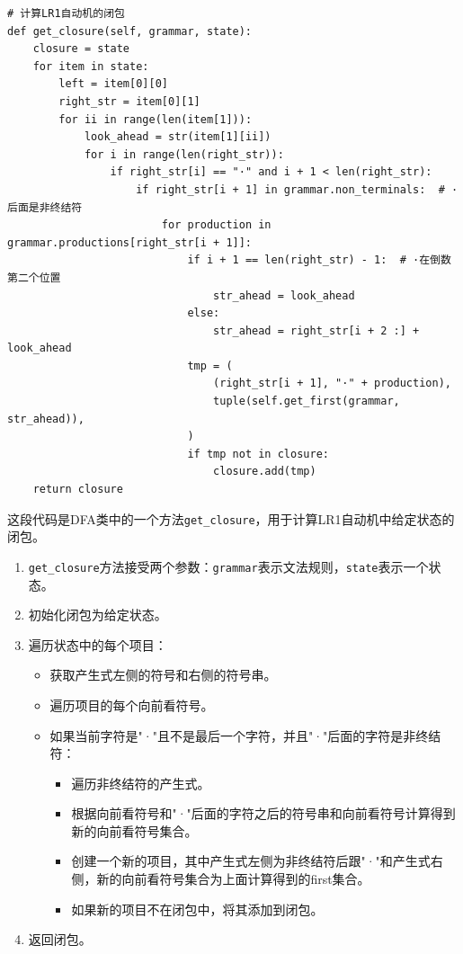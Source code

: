 \documentclass[lang=cn,11pt,a4paper]{elegantpaper}
\begin{document}
\begin{lstlisting}
# 计算LR1自动机的闭包
def get_closure(self, grammar, state):
    closure = state
    for item in state:
        left = item[0][0]
        right_str = item[0][1]
        for ii in range(len(item[1])):
            look_ahead = str(item[1][ii])
            for i in range(len(right_str)):
                if right_str[i] == "·" and i + 1 < len(right_str):
                    if right_str[i + 1] in grammar.non_terminals:  # ·后面是非终结符
                        for production in grammar.productions[right_str[i + 1]]:
                            if i + 1 == len(right_str) - 1:  # ·在倒数第二个位置
                                str_ahead = look_ahead
                            else:
                                str_ahead = right_str[i + 2 :] + look_ahead
                            tmp = (
                                (right_str[i + 1], "·" + production),
                                tuple(self.get_first(grammar, str_ahead)),
                            )
                            if tmp not in closure:
                                closure.add(tmp)
    return closure
\end{lstlisting}

这段代码是DFA类中的一个方法\lstinline{get_closure}，用于计算LR1自动机中给定状态的闭包。

\begin{enumerate}
    \item \lstinline{get_closure}方法接受两个参数：\lstinline{grammar}表示文法规则，\lstinline{state}表示一个状态。
    \item 初始化闭包为给定状态。
    \item 遍历状态中的每个项目：
    \begin{itemize}
        \item 获取产生式左侧的符号和右侧的符号串。
        \item 遍历项目的每个向前看符号。
        \item 如果当前字符是"·"且不是最后一个字符，并且"·"后面的字符是非终结符：
        \begin{itemize}
            \item 遍历非终结符的产生式。
            \item 根据向前看符号和"·"后面的字符之后的符号串和向前看符号计算得到新的向前看符号集合。
            \item 创建一个新的项目，其中产生式左侧为非终结符后跟"·"和产生式右侧，新的向前看符号集合为上面计算得到的first集合。
            \item 如果新的项目不在闭包中，将其添加到闭包。
        \end{itemize}
    \end{itemize}
    \item 返回闭包。
\end{enumerate}
\end{document}
